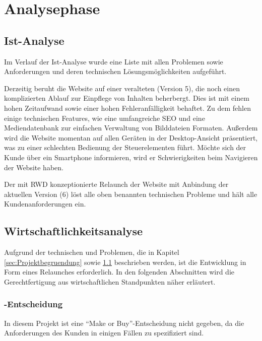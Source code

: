 \section{Analysephase} 
\label{sec:Analysephase}


\subsection{Ist-Analyse} 
\label{sec:IstAnalyse}

Im Verlauf der Ist-Analyse wurde eine Liste mit allen Problemen sowie
Anforderungen und deren technischen Lösungsmöglichkeiten aufgeführt. 

Derzeitig beruht die Website auf einer veralteten \ct (Version 5), die
noch einen komplizierten Ablauf zur Einpflege von Inhalten beherbergt. Dies ist mit
einem hohen Zeitaufwand sowie einer hohen Fehleranfälligkeit behaftet. Zu dem
fehlen einige technischen Features, wie \zB eine umfangreiche \ac{SEO} und eine
Mediendatenbank zur einfachen Verwaltung von Bilddateien \oae Formaten. 
Außerdem wird die Website momentan auf allen Geräten in der Desktop-Ansicht
präsentiert, was zu einer schlechten Bedienung der Steuerelementen führt.
Möchte sich der Kunde über ein Smartphone informieren, wird er
Schwierigkeiten beim Navigieren der Website haben. 

Der mit \ac{RWD} konzeptionierte Relaunch der Website mit Anbindung der
aktuellen \ct Version (6) löst alle oben benannten technischen Probleme und hält
alle Kundenanforderungen ein.

\subsection{Wirtschaftlichkeitsanalyse}
\label{sec:Wirtschaftlichkeitsanalyse}
Aufgrund der technischen und  Problemen, die in
Kapitel \ref{sec:Projektbegruendung} 
sowie \ref{sec:IstAnalyse}  beschrieben werden,
ist die Entwicklung in Form eines Relaunches erforderlich. In den folgenden Abschnitten wird die Gerechtfertigung aus wirtschaftlichen Standpunkten näher
erläutert.

\subsubsection{-Entscheidung}
\label{sec:MakeOrBuyEntscheidung}
In diesem Projekt ist eine "`Make or Buy"'-Entscheidung nicht gegeben, da die
Anforderungen des Kunden \kunde in einigen Fällen zu spezifiziert sind.

